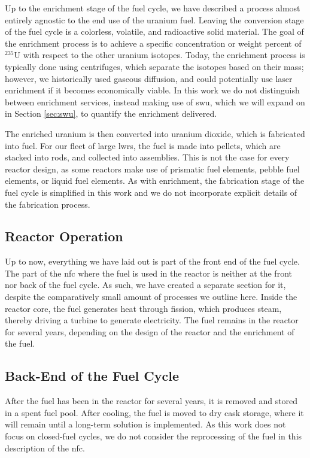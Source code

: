 Up to the enrichment stage of the fuel cycle, we have described a process
almost entirely agnostic to the end use of the uranium fuel. Leaving the
conversion stage of the fuel cycle is a colorless, volatile, and radioactive
solid material. The goal of the enrichment process is to achieve a specific
concentration or weight percent of $^{235}$U with respect to the other uranium
isotopes. Today, the enrichment process is typically done using centrifuges,
which separate the isotopes based on their mass; however, we historically used
gaseous diffusion, and could potentially use laser enrichment if it becomes
economically viable. In this work we do not distinguish between enrichment
services, instead making use of \gls{swu}, which we will expand on in Section
\ref{sec:swu}, to quantify the enrichment delivered.

The enriched uranium is then converted into uranium dioxide, which is
fabricated into fuel. For our fleet of large \glspl{lwr}, the fuel is made into
pellets, which are stacked into rods, and collected into assemblies. This is
not the case for every reactor design, as some reactors make use of prismatic
fuel elements, pebble fuel elements, or liquid fuel elements. As with
enrichment, the fabrication stage of the fuel cycle is simplified in this work
and we do not incorporate explicit details of the fabrication process.

\subsection{Reactor Operation}
\label{sec:reactor_operation}
Up to now, everything we have laid out is part of the front end of the fuel
cycle. The part of the \gls{nfc} where the fuel is used in the reactor is
neither at the front nor back of the fuel cycle. As such, we have created a
separate section for it, despite the comparatively small amount of processes we
outline here. Inside the reactor core, the fuel generates heat through fission,
which produces steam, thereby driving a turbine to generate electricity. The
fuel remains in the reactor for several years, depending on the design of the
reactor and the enrichment of the fuel. %


\subsection{Back-End of the Fuel Cycle}
\label{sec:back_end}
After the fuel has been in the reactor for several years, it is removed and
stored in a spent fuel pool. After cooling, the fuel is moved to dry cask
storage, where it will remain until a long-term solution is implemented. As
this work does not focus on closed-fuel cycles, we do not consider the
reprocessing of the fuel in this description of the \gls{nfc}.

